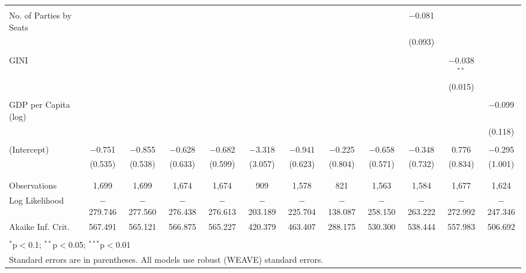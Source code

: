 \documentclass[a4paper]{article}\usepackage[]{graphicx}\usepackage[]{color}
\begin{document}
\begin{table}[H]
\begin{center}
{{\begin{tabular}{@{\extracolsep{5pt}}lccccccccccc}
  & & & & & & & & & & & \\ 
 No. of Parties by Seats &  &  &  &  &  &  &  &  & $-$0.081 &  &  \\ 
  &  &  &  &  &  &  &  &  & (0.093) &  &  \\ 
  & & & & & & & & & & & \\ 
 GINI &  &  &  &  &  &  &  &  &  & $-$0.038$^{**}$ &  \\ 
  &  &  &  &  &  &  &  &  &  & (0.015) &  \\ 
  & & & & & & & & & & & \\ 
 GDP per Capita (log) &  &  &  &  &  &  &  &  &  &  & $-$0.099 \\ 
  &  &  &  &  &  &  &  &  &  &  & (0.118) \\ 
  & & & & & & & & & & & \\ 
 (Intercept) & $-$0.751 & $-$0.855 & $-$0.628 & $-$0.682 & $-$3.318 & $-$0.941 & $-$0.225 & $-$0.658 & $-$0.348 & 0.776 & $-$0.295 \\ 
  & (0.535) & (0.538) & (0.633) & (0.599) & (3.057) & (0.623) & (0.804) & (0.571) & (0.732) & (0.834) & (1.001) \\ 
  & & & & & & & & & & & \\ 
\hline \\[-1.8ex] 
Observations & 1,699 & 1,699 & 1,674 & 1,674 & 909 & 1,578 & 821 & 1,563 & 1,584 & 1,677 & 1,624 \\ 
Log Likelihood & $-$279.746 & $-$277.560 & $-$276.438 & $-$276.613 & $-$203.189 & $-$225.704 & $-$138.087 & $-$258.150 & $-$263.222 & $-$272.992 & $-$247.346 \\ 
Akaike Inf. Crit. & 567.491 & 565.121 & 566.875 & 565.227 & 420.379 & 463.407 & 288.175 & 530.300 & 538.444 & 557.983 & 506.692 \\ 
\hline 
\hline \\[-1.8ex] 
\multicolumn{12}{l}{$^{*}$p$<$0.1; $^{**}$p$<$0.05; $^{***}$p$<$0.01} \\ 
\multicolumn{12}{l}{Standard errors are in parentheses. All models use robust (WEAVE) standard errors.} \\ 
\end{tabular} 

}}
\end{center}

\end{table}
\end{document}
